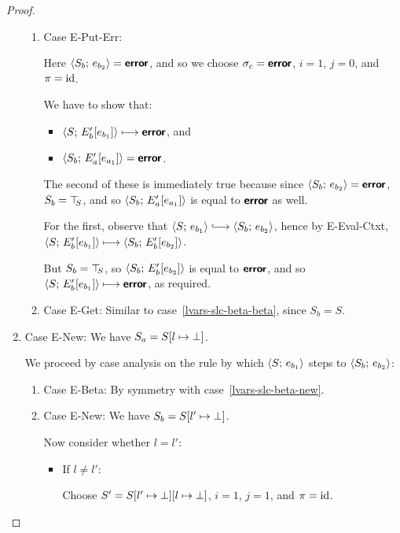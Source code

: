 \begin{proof}
\begin{enumerate}
\begin{enumerate}
    \item \label{lvars-slc-beta-put-err}Case {\sc E-Put-Err}:

      Here $\langle S_b;\, e_{b_2} \rangle = \textbf{\textsf{error}}$, and so we choose $\sigma_c
      = \textbf{\textsf{error}}$, $i = 1$, $j = 0$, and $\pi = \mathrm{id}$.

      We have to show that:
      \begin{itemize}
      \item $\langle S;\, E'_b\hspace{-0.5mm}\left[e_{b_1}\right] \rangle \longmapsto \textbf{\textsf{error}}$,
        and
      \item $\langle S_b;\, E'_a\hspace{-0.5mm}\left[e_{a_1}\right] \rangle = \textbf{\textsf{error}}$.
      \end{itemize}

      The second of these is immediately true because since
      $\langle S_b;\, e_{b_2} \rangle = \textbf{\textsf{error}}$, $S_b = \top\hspace{-0.85mm}_{S}$, and so
      $\langle S_b;\, E'_a\hspace{-0.5mm}\left[e_{a_1}\right] \rangle$ is equal to $\textbf{\textsf{error}}$ as
      well.

      For the first, observe that $\config{S}{e_{b_1}} \parstepsto
      \config{S_b}{e_{b_2}}$, hence by {\sc E-Eval-Ctxt},
      $\langle S;\, E'_b\hspace{-0.5mm}\left[e_{b_1}\right] \rangle \longmapsto
      \langle S_b;\, E'_b\hspace{-0.5mm}\left[e_{b_2}\right] \rangle$.

      But $S_b = \top\hspace{-0.85mm}_{S}$, so $\langle S_b;\, E'_b\hspace{-0.5mm}\left[e_{b_2}\right] \rangle$
      is equal to $\textbf{\textsf{error}}$, and so
      $\langle S;\, E'_b\hspace{-0.5mm}\left[e_{b_1}\right] \rangle \longmapsto \textbf{\textsf{error}}$, as
      required.

    \item \label{lvars-slc-beta-get}Case {\sc E-Get}: Similar to
      case~\ref{lvars-slc-beta-beta}, since $S_b = S$.

    \end{enumerate}
  \item Case {\sc E-New}: We have $S_a = S[l \mapsto \bot]$.

    We proceed by case analysis on the rule by which
    $\langle S;\, e_{b_1} \rangle$ steps to $\langle S_b;\, e_{b_2} \rangle$:
    \begin{enumerate}
    \item \label{lvars-slc-new-beta}Case {\sc E-Beta}: By symmetry
      with case~\ref{lvars-slc-beta-new}.
    \item \label{lvars-slc-new-new}Case {\sc E-New}: We have $S_b =
      S[l' \mapsto \bot]$.

      Now consider whether $l = l'$:
      \begin{itemize}
      \item If $l \neq l'$:

        Choose $S' = S[l' \mapsto \bot][l \mapsto \bot]$, $i =
        1$, $j = 1$, and $\pi = \mathrm{id}$.


\end{itemize}
\end{enumerate}
\end{enumerate}
\end{proof}
